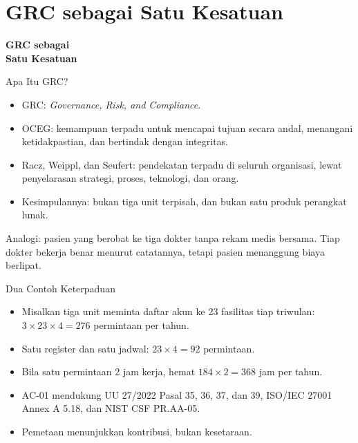 \documentclass[aspectratio=169, table, 12pt]{beamer}
\begin{document}
\section{GRC sebagai Satu Kesatuan}

\begin{frame}{\hfill}
  \centering
  \Huge{\textbf{GRC sebagai\\Satu Kesatuan}}
\end{frame}

\begin{frame}{{\Large Apa Itu GRC?}}
  \vspace{4pt}
  \small
  \begin{itemize}
    \item GRC: \textit{Governance, Risk, and Compliance}.
    \item OCEG: kemampuan terpadu untuk mencapai tujuan secara andal, menangani ketidakpastian,
          dan bertindak dengan integritas.
    \item Racz, Weippl, dan Seufert: pendekatan terpadu di seluruh organisasi, lewat penyelarasan
          strategi, proses, teknologi, dan orang.
    \item Kesimpulannya: bukan tiga unit terpisah, dan bukan satu produk perangkat lunak.
  \end{itemize}
  \vspace{6pt}
  {\footnotesize Analogi: pasien yang berobat ke tiga dokter tanpa rekam medis bersama. Tiap dokter
  bekerja benar menurut catatannya, tetapi pasien menanggung biaya berlipat.}
\end{frame}

\begin{frame}{{\Large Dua Contoh Keterpaduan}}
  \vspace{6pt}
  \small
  \begin{itemize}
    \item Misalkan tiga unit meminta daftar akun ke 23 fasilitas tiap triwulan:
          $3 \times 23 \times 4 = 276$ permintaan per tahun.
    \item Satu register dan satu jadwal: $23 \times 4 = 92$ permintaan.
    \item Bila satu permintaan 2 jam kerja, hemat $184 \times 2 = 368$ jam per tahun.
    \item AC-01 mendukung UU 27/2022 Pasal 35, 36, 37, dan 39, ISO/IEC 27001 Annex A 5.18, dan NIST CSF
          PR.AA-05.
    \item Pemetaan menunjukkan kontribusi, bukan kesetaraan.
  \end{itemize}
\end{frame}
\end{document}
